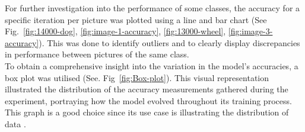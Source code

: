 For further investigation into the performance of some classes, the accuracy for a specific iteration per picture was plotted 
using a line and bar chart (See Fig.~\ref{fig:14000-dog}, \ref{fig:image-1-accuracy}, \ref{fig:13000-wheel}, \ref{fig:image-3-accuracy}). 
This was done to identify outliers and to clearly display discrepancies in performance between pictures of the same class.\\

To obtain a comprehensive insight into the variation in the model's accuracies, a box plot was utilised (See. Fig~\ref{fig:Box-plot}). This visual representation illustrated the distribution of the accuracy measurements gathered during the experiment, portraying how the model evolved throughout its training process.
This graph is a good choice since its use case is illustrating the distribution of data \parencite{Tableau}.\\

